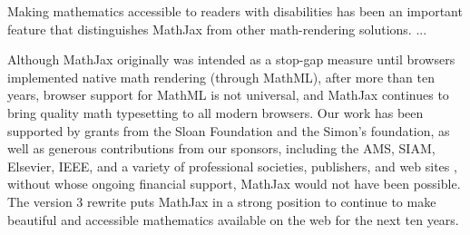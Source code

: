 \documentclass[11pt]{article} %
\begin{document}
Making mathematics accessible to readers with disabilities has been an
important feature that distinguishes MathJax from other math-rendering
solutions. ...




Although MathJax originally was intended as a stop-gap measure until
browsers implemented native math rendering (through MathML), after
more than ten years, browser support for MathML is not universal, and
MathJax continues to bring quality math typesetting to all modern
browsers.  Our work has been supported by grants from the Sloan
Foundation and the Simon's foundation, as well as generous
contributions from our sponsors, including the AMS, SIAM, Elsevier,
IEEE, and a variety of professional societies, publishers, and web
sites \cite{MJ-sponsors}, without whose ongoing financial support,
MathJax would not have been possible.  The version 3 rewrite puts
MathJax in a strong position to continue to make beautiful and
accessible mathematics available on the web for the next ten years.
\end{document}
